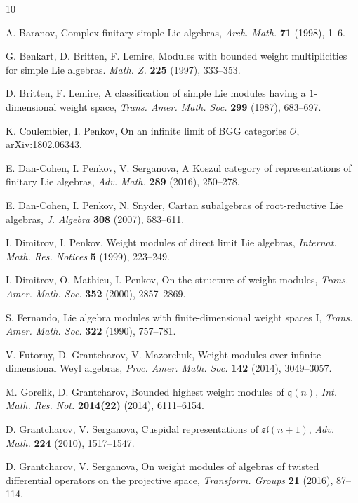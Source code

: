 \documentclass[12pt]{amsart}
\begin{document}
\begin{thebibliography}{10}




 A. Baranov, Complex finitary simple Lie algebras, {\it Arch. Math.} {\bf 71} (1998), 1--6.

 G. Benkart, D. Britten, F. Lemire,
Modules with bounded weight multiplicities for simple Lie
algebras. {\it Math. Z.} {\bf 225} (1997),  333--353.


 D. Britten, F. Lemire, A classification of simple Lie modules
having a $1$-dimensional weight space, {\it Trans. Amer. Math.
Soc.} {\bf 299} (1987), 683--697.


 K. Coulembier, I. Penkov, On an infinite limit of BGG categories $\mathcal{O}$,  arXiv:1802.06343.


 E. Dan-Cohen, I. Penkov, V. Serganova, A Koszul category of representations of finitary Lie algebras, {\it Adv. Math.} {\bf 289} (2016), 250--278.



 E. Dan-Cohen, I. Penkov, N. Snyder, Cartan subalgebras of root-reductive Lie algebras, {\it J. Algebra}  {\bf 308} (2007), 583--611.


 I. Dimitrov, I. Penkov, Weight modules of direct limit Lie algebras, {\it Internat. Math. Res. Notices} {\bf 5} (1999), 223--249.


 I. Dimitrov, O. Mathieu, I. Penkov, On the structure of weight modules, {\it Trans. Amer. Math. Soc.} {\bf 352} (2000), 2857--2869.



 S. Fernando, Lie algebra modules with finite-dimensional weight spaces I, {\it Trans. Amer. Math. Soc.}  {\bf 322} (1990), 757--781.



 V. Futorny,  D. Grantcharov, V. Mazorchuk, Weight modules over infinite dimensional Weyl algebras, {\it Proc. Amer. Math. Soc.} {\bf 142} (2014), 3049--3057.

 M. Gorelik, D. Grantcharov, Bounded highest weight modules of $\mathfrak q (n)$, {\it Int. Math. Res. Not.}  {\bf 2014(22)} (2014), 6111--6154. 



 D. Grantcharov, V. Serganova, Cuspidal representations of
$\mathfrak{sl}(n+1)$, {\it Adv. Math.} {\bf 224} (2010), 1517--1547.


 D. Grantcharov, V. Serganova, On weight modules of algebras of twisted differential operators on the projective space,  {\it Transform. Groups} {\bf 21} (2016), 87--114. 





\end{thebibliography}
\end{document}
